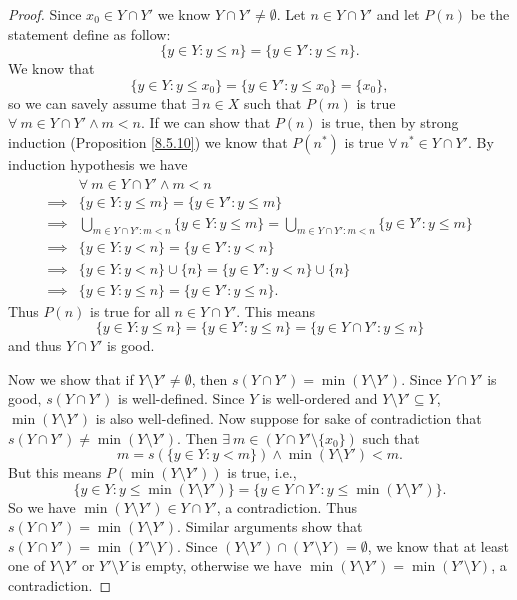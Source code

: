 \begin{proof}
    Since \(x_0 \in Y \cap Y'\) we know \(Y \cap Y' \neq \emptyset\).
    Let \(n \in Y \cap Y'\) and let \(P(n)\) be the statement define as follow:
    \[
        \{y \in Y : y \leq n\} = \{y \in Y' : y \leq n\}.
    \]
    We know that
    \[
        \{y \in Y : y \leq x_0\} = \{y \in Y' : y \leq x_0\} = \{x_0\},
    \]
    so we can savely assume that \(\exists\ n \in X\) such that \(P(m)\) is true \(\forall\ m \in Y \cap Y' \land m < n\).
    If we can show that \(P(n)\) is true, then by strong induction (Proposition \ref{8.5.10}) we know that \(P(n^*)\) is true \(\forall\ n^* \in Y \cap Y'\).
    By induction hypothesis we have
    \begin{align*}
                 & \forall\ m \in Y \cap Y' \land m < n                                                                                 \\
        \implies & \{y \in Y : y \leq m\} = \{y \in Y' : y \leq m\}                                                                     \\
        \implies & \bigcup_{m \in Y \cap Y' : m < n} \{y \in Y : y \leq m\} = \bigcup_{m \in Y \cap Y' : m < n} \{y \in Y' : y \leq m\} \\
        \implies & \{y \in Y : y < n\} = \{y \in Y' : y < n\}                                                                           \\
        \implies & \{y \in Y : y < n\} \cup \{n\} = \{y \in Y' : y < n\} \cup \{n\}                                                     \\
        \implies & \{y \in Y : y \leq n\} = \{y \in Y' : y \leq n\}.
    \end{align*}
    Thus \(P(n)\) is true for all \(n \in Y \cap Y'\).
    This means
    \[
        \{y \in Y : y \leq n\} = \{y \in Y' : y \leq n\} = \{y \in Y \cap Y' : y \leq n\}
    \]
    and thus \(Y \cap Y'\) is good.

    Now we show that if \(Y \setminus Y' \neq \emptyset\), then \(s(Y \cap Y') = \min(Y \setminus Y')\).
    Since \(Y \cap Y'\) is good, \(s(Y \cap Y')\) is well-defined.
    Since \(Y\) is well-ordered and \(Y \setminus Y' \subseteq Y\), \(\min(Y \setminus Y')\) is also well-defined.
    Now suppose for sake of contradiction that \(s(Y \cap Y') \neq \min(Y \setminus Y')\).
    Then \(\exists\ m \in (Y \cap Y' \setminus \{x_0\})\) such that
    \[
        m = s(\{y \in Y : y < m\}) \land \min(Y \setminus Y') < m.
    \]
    But this means \(P(\min(Y \setminus Y'))\) is true, i.e.,
    \[
        \{y \in Y : y \leq \min(Y \setminus Y')\} = \{y \in Y \cap Y' : y \leq \min(Y \setminus Y')\}.
    \]
    So we have \(\min(Y \setminus Y') \in Y \cap Y'\), a contradiction.
    Thus \(s(Y \cap Y') = \min(Y \setminus Y')\).
    Similar arguments show that \(s(Y \cap Y') = \min(Y' \setminus Y)\).
    Since \((Y \setminus Y') \cap (Y' \setminus Y) = \emptyset\), we know that at least one of \(Y \setminus Y'\) or \(Y' \setminus Y\) is empty, otherwise we have \(\min(Y \setminus Y') = \min(Y' \setminus Y)\), a contradiction.


\end{proof}
